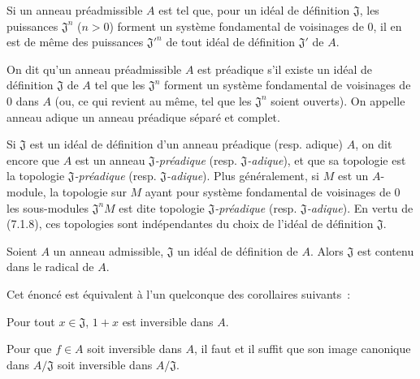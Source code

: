 \begin{corollary}[7.1.8]
\label{0.7.1.8-fr}
Si un anneau préadmissible $A$ est tel que, pour un idéal de définition
$\mathfrak J$, les puissances $\mathfrak J^n$ ($n>0$) forment un système
fondamental de voisinages de $0$, il en est de même des puissances
${\mathfrak J'}^n$ de tout idéal de définition $\mathfrak J'$ de $A$.
\end{corollary}

\begin{definition}[7.1.9]
\label{0.7.1.9-fr}
On dit qu'un anneau préadmissible $A$ est préadique s'il existe un idéal de
définition $\mathfrak J$ de $A$ tel que les $\mathfrak J^n$ forment un système
fondamental de voisinages de $0$ dans $A$ (ou, ce qui revient au même, tel que
les $\mathfrak J^n$ soient ouverts). On appelle anneau adique un anneau
préadique séparé et complet.
\end{definition}

Si $\mathfrak J$ est un idéal de définition d'un anneau préadique (resp.
adique) $A$, on dit encore que $A$ est un anneau
\emph{$\mathfrak J$-préadique} (resp. \emph{$\mathfrak J$-adique}), et que sa
topologie est la topologie \emph{$\mathfrak J$-préadique} (resp.
\emph{$\mathfrak J$-adique}). Plus généralement, si $M$ est un $A$-module, la
topologie sur $M$ ayant pour système fondamental de voisinages de $0$ les
sous-modules $\mathfrak J^nM$ est dite topologie
\emph{$\mathfrak J$-préadique} (resp. \emph{$\mathfrak J$-adique}). En vertu
de (7.1.8), ces topologies sont indépendantes du choix de l'idéal de définition
$\mathfrak J$.

\begin{proposition}[7.1.10]
\label{0.7.1.10-fr}
Soient $A$ un anneau admissible, $\mathfrak J$ un idéal de définition de $A$.
Alors $\mathfrak J$ est contenu dans le radical de $A$.
\end{proposition}

Cet énoncé est équivalent à l'un quelconque des corollaires suivants~:

\begin{corollary}[7.1.11]
\label{0.7.1.11-fr}
Pour tout $x\in\mathfrak J$, $1+x$ est inversible dans $A$.
\end{corollary}

\begin{corollary}[7.1.12]
\label{0.7.1.12-fr}
Pour que $f\in A$ soit inversible dans $A$, il faut et il suffit que son image
canonique dans $A/\mathfrak J$ soit inversible dans $A/\mathfrak J$.
\end{corollary}

